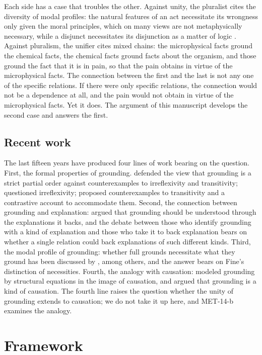 \documentclass{situationist-preprint}
\begin{document}
Each side has a case that troubles the other. Against unity, the pluralist cites the diversity of modal profiles: the natural features of an act necessitate its wrongness only given the moral principles, which on many views are not metaphysically necessary, while a disjunct necessitates its disjunction as a matter of logic \citep{Fine2002}. Against pluralism, the unifier cites mixed chains: the microphysical facts ground the chemical facts, the chemical facts ground facts about the organism, and those ground the fact that it is in pain, so that the pain obtains in virtue of the microphysical facts. The connection between the first and the last is not any one of the specific relations. If there were only specific relations, the connection would not be a dependence at all, and the pain would not obtain in virtue of the microphysical facts. Yet it does. The argument of this manuscript develops the second case and answers the first.

\subsection{Recent work}\label{s:recent}

The last fifteen years have produced four lines of work bearing on the question. First, the formal properties of grounding. \citet{Raven2013} defended the view that grounding is a strict partial order against counterexamples to irreflexivity and transitivity; \citet{Jenkins2011} questioned irreflexivity; \citet{Schaffer2012} proposed counterexamples to transitivity and a contrastive account to accommodate them. Second, the connection between grounding and explanation: \citet{deRosset2013} argued that grounding should be understood through the explanations it backs, and the debate between those who identify grounding with a kind of explanation and those who take it to back explanation bears on whether a single relation could back explanations of such different kinds. Third, the modal profile of grounding: whether full grounds necessitate what they ground has been discussed by \citet{Trogdon2013}, among others, and the answer bears on Fine's distinction of necessities. Fourth, the analogy with causation: \citet{Schaffer2016} modeled grounding by structural equations in the image of causation, and \citet{Wilson2018} argued that grounding is a kind of causation. The fourth line raises the question whether the unity of grounding extends to causation; we do not take it up here, and MET-14-b examines the analogy.

\section{Framework}\label{s:framework}
\end{document}

